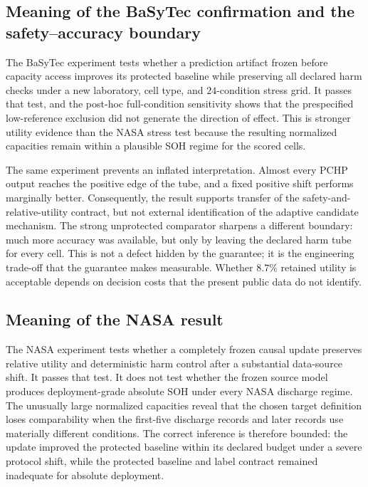 \documentclass[11pt]{article}
\begin{document}
\subsection{Meaning of the BaSyTec confirmation and the safety--accuracy boundary}

The BaSyTec experiment tests whether a prediction artifact frozen before capacity access improves its protected baseline while preserving all declared harm checks under a new laboratory, cell type, and $24$-condition stress grid. It passes that test, and the post-hoc full-condition sensitivity shows that the prespecified low-reference exclusion did not generate the direction of effect. This is stronger utility evidence than the NASA stress test because the resulting normalized capacities remain within a plausible SOH regime for the scored cells.

The same experiment prevents an inflated interpretation. Almost every PCHP output reaches the positive edge of the tube, and a fixed positive shift performs marginally better. Consequently, the result supports transfer of the safety-and-relative-utility contract, but not external identification of the adaptive candidate mechanism. The strong unprotected comparator sharpens a different boundary: much more accuracy was available, but only by leaving the declared harm tube for every cell. This is not a defect hidden by the guarantee; it is the engineering trade-off that the guarantee makes measurable. Whether $8.7\%$ retained utility is acceptable depends on decision costs that the present public data do not identify.

\subsection{Meaning of the NASA result}

The NASA experiment tests whether a completely frozen causal update preserves relative utility and deterministic harm control after a substantial data-source shift. It passes that test. It does not test whether the frozen source model produces deployment-grade absolute SOH under every NASA discharge regime. The unusually large normalized capacities reveal that the chosen target definition loses comparability when the first-five discharge records and later records use materially different conditions. The correct inference is therefore bounded: the update improved the protected baseline within its declared budget under a severe protocol shift, while the protected baseline and label contract remained inadequate for absolute deployment.
\end{document}
